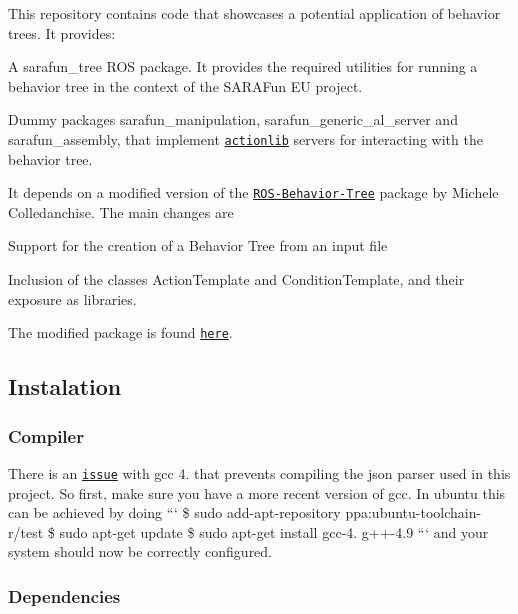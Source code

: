 This repository contains code that showcases a potential application of behavior trees. It provides\-:
\begin{DoxyItemize}
\item A {\ttfamily sarafun\-\_\-tree} R\-O\-S package. It provides the required utilities for running a behavior tree in the context of the S\-A\-R\-A\-Fun E\-U project.
\item Dummy packages {\ttfamily sarafun\-\_\-manipulation}, {\ttfamily sarafun\-\_\-generic\-\_\-al\-\_\-server} and {\ttfamily sarafun\-\_\-assembly}, that implement \href{http://wiki.ros.org/actionlib}{\tt actionlib} servers for interacting with the behavior tree.
\end{DoxyItemize}

It depends on a modified version of the \href{https://github.com/miccol/ROS-Behavior-Tree}{\tt R\-O\-S-\/\-Behavior-\/\-Tree} package by Michele Colledanchise. The main changes are
\begin{DoxyItemize}
\item Support for the creation of a Behavior Tree from an input file
\item Inclusion of the classes {\ttfamily Action\-Template} and {\ttfamily Condition\-Template}, and their exposure as libraries.
\end{DoxyItemize}

The modified package is found \href{https://github.com/diogoalmeida/ROS-Behavior-Tree}{\tt here}.

\subsection*{Instalation }

\subsubsection*{Compiler}

There is an \href{https://github.com/nlohmann/json/pull/212}{\tt issue} with gcc 4. that prevents compiling the json parser used in this project. So first, make sure you have a more recent version of gcc. In ubuntu this can be achieved by doing ``` \$ sudo add-\/apt-\/repository ppa\-:ubuntu-\/toolchain-\/r/test \$ sudo apt-\/get update \$ sudo apt-\/get install gcc-\/4. g++-\/4.9 ``` and your system should now be correctly configured.

\subsubsection*{Dependencies}


